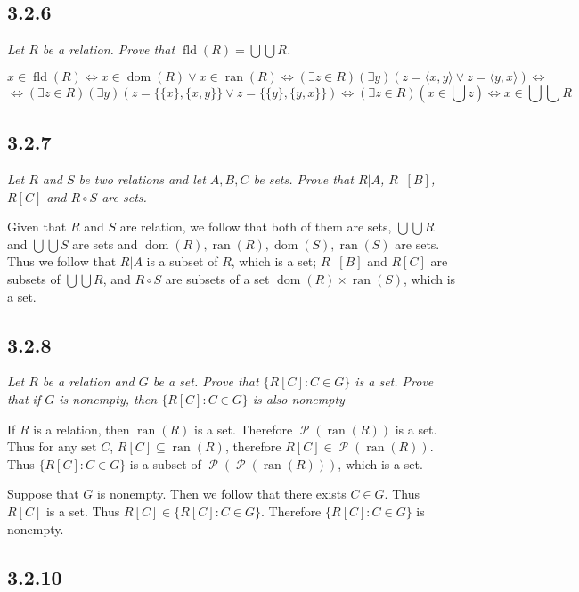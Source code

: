 \documentclass[11pt,oneside,titlepage]{book}
\DeclareMathOperator \pow {\mathcal {P}}
\DeclareMathOperator \fld {fld}
\DeclareMathOperator \inv {^{-1}}
\DeclareMathOperator \lra {\Leftrightarrow}
\DeclareMathOperator \dom {dom}
\DeclareMathOperator \ran {ran}
\newcommand{\eangle}[1]{\langle #1 \rangle}
\begin{document}
\subsection*{3.2.6}

\textit{Let $R$ be a relation. Prove that $\fld(R) = \bigcup \bigcup R$.}

$$x \in \fld(R) \lra x \in \dom(R) \lor x \in \ran(R) \lra
(\exists z \in R)(\exists y)(z = \eangle{x, y} \lor z = \eangle{y, x}) \lra$$
$$ \lra
(\exists z \in R)(\exists y)(z = \{\{x\}, \{x, y\}\} \lor z = \{\{y\}, \{y, x\}\})
\lra
(\exists z \in R)(x \in \bigcup z) \lra x \in \bigcup \bigcup R$$

\subsection*{3.2.7}

\textit{Let $R$ and $S$ be two relations and let $A, B, C$ be sets. Prove that $R|A$,
  $R\inv [B]$, $R[C]$ and $R \circ S$ are sets.}

Given that $R$ and $S$ are relation, we follow that both of them are sets,
$\bigcup \bigcup R$ and  $\bigcup \bigcup S$ are sets and $\dom (R), \ran(R), \dom(S), \ran(S)$
are sets. Thus we follow that $R|A$ is a subset of
$R$, which is a set; $R\inv [B]$  and $R[C]$ are subsets of $\bigcup \bigcup R$,
and $R \circ S$ are subsets of a set $\dom (R) \times \ran(S)$, which is a set.


\subsection*{3.2.8}

\textit{Let $R$ be a relation and $G$ be a set. Prove that $\{R[C]: C \in G\}$ is a set. Prove
  that if $G$ is nonempty, then $\{R[C]: C \in G\}$ is also nonempty}

If $R$ is a relation, then $\ran(R)$ is a set. Therefore $\pow(\ran(R))$ is a set. Thus
for any set $C$, $R[C] \subseteq \ran(R)$, therefore $R[C] \in \pow(\ran(R))$. Thus
$\{R[C]: C \in G\}$ is a subset of $\pow(\pow(\ran(R)))$, which is a set.

Suppose that $G$ is nonempty. Then we follow that there exists $C \in G$. Thus
$R[C]$ is a set. Thus $R[C] \in \{R[C]: C \in G\}$. Therefore $\{R[C]: C \in G\}$ is
nonempty.

\subsection*{3.2.10}
\end{document}
